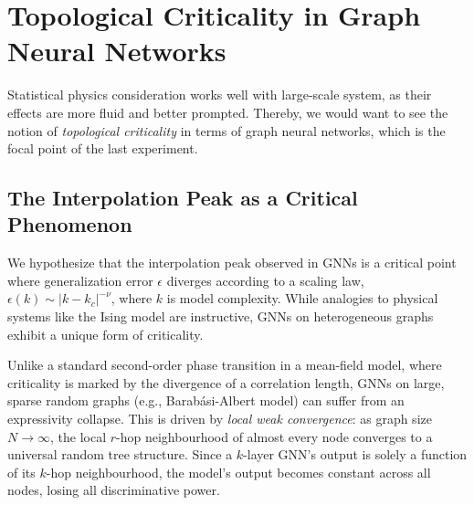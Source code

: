 \documentclass[twoside,10pt]{article}
\begin{document}
\section{Topological Criticality in Graph Neural Networks}
Statistical physics consideration works well with large-scale system, as their effects are more fluid and better prompted. Thereby, we would want to see the notion of \textit{topological criticality} in terms of graph neural networks, which is the focal point of the last experiment.
\subsection{The Interpolation Peak as a Critical Phenomenon}
We hypothesize that the interpolation peak observed in GNNs is a critical point where generalization error $\epsilon$ diverges according to a scaling law, $\epsilon(k) \sim |k - k_c|^{-\nu}$, where $k$ is model complexity. While analogies to physical systems like the Ising model are instructive, GNNs on heterogeneous graphs exhibit a unique form of criticality.

Unlike a standard second-order phase transition in a mean-field model, where criticality is marked by the divergence of a correlation length, GNNs on large, sparse random graphs (e.g., Barabási-Albert model) can suffer from an expressivity collapse. This is driven by \textit{local weak convergence}: as graph size $N \to \infty$, the local $r$-hop neighbourhood of almost every node converges to a universal random tree structure. Since a $k$-layer GNN's output is solely a function of its $k$-hop neighbourhood, the model's output becomes constant across all nodes, losing all discriminative power.
\end{document}
